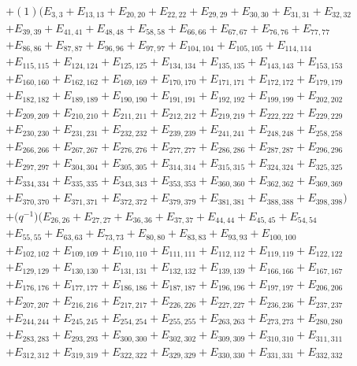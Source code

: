 \documentclass[pdftex]{sigma}
\numberwithin{equation}{section}
\theoremstyle{definition}
\begin{document}
\begin{align*}
&+(1)(E_{3,3}+E_{13,13}+E_{20,20}+E_{22,22}+E_{29,29}+E_{30,30}+E_{31,31}+E_{32,32}\\
&+E_{39,39}+E_{41,41}+E_{48,48}+E_{58,58}+E_{66,66}+E_{67,67}+E_{76,76}+E_{77,77}\\
&+E_{86,86}+E_{87,87}+E_{96,96}+E_{97,97}+E_{104,104}+E_{105,105}+E_{114,114}\\
&+E_{115,115}+E_{124,124}+E_{125,125}+E_{134,134}+E_{135,135}+E_{143,143}+E_{153,153}\\
&+E_{160,160}+E_{162,162}+E_{169,169}+E_{170,170}+E_{171,171}+E_{172,172}+E_{179,179}\\
&+E_{182,182}+E_{189,189}+E_{190,190}+E_{191,191}+E_{192,192}+E_{199,199}+E_{202,202}\\
&+E_{209,209}+E_{210,210}+E_{211,211}+E_{212,212}+E_{219,219}+E_{222,222}+E_{229,229}\\
&+E_{230,230}+E_{231,231}+E_{232,232}+E_{239,239}+E_{241,241}+E_{248,248}+E_{258,258}\\
&+E_{266,266}+E_{267,267}+E_{276,276}+E_{277,277}+E_{286,286}+E_{287,287}+E_{296,296}\\
&+E_{297,297}+E_{304,304}+E_{305,305}+E_{314,314}+E_{315,315}+E_{324,324}+E_{325,325}\\
&+E_{334,334}+E_{335,335}+E_{343,343}+E_{353,353}+E_{360,360}+E_{362,362}+E_{369,369}\\
&+E_{370,370}+E_{371,371}+E_{372,372}+E_{379,379}+E_{381,381}+E_{388,388}+E_{398,398})\\
&+\bigl(q^{-1}\bigr)(E_{26,26}+E_{27,27}+E_{36,36}+E_{37,37}+E_{44,44}+E_{45,45}+E_{54,54}\\
&+E_{55,55}+E_{63,63}+E_{73,73}+E_{80,80}+E_{83,83}+E_{93,93}+E_{100,100}\\
&+E_{102,102}+E_{109,109}+E_{110,110}+E_{111,111}+E_{112,112}+E_{119,119}+E_{122,122}\\
&+E_{129,129}+E_{130,130}+E_{131,131}+E_{132,132}+E_{139,139}+E_{166,166}+E_{167,167}\\
&+E_{176,176}+E_{177,177}+E_{186,186}+E_{187,187}+E_{196,196}+E_{197,197}+E_{206,206}\\
&+E_{207,207}+E_{216,216}+E_{217,217}+E_{226,226}+E_{227,227}+E_{236,236}+E_{237,237}\\
&+E_{244,244}+E_{245,245}+E_{254,254}+E_{255,255}+E_{263,263}+E_{273,273}+E_{280,280}\\
&+E_{283,283}+E_{293,293}+E_{300,300}+E_{302,302}+E_{309,309}+E_{310,310}+E_{311,311}\\
&+E_{312,312}+E_{319,319}+E_{322,322}+E_{329,329}+E_{330,330}+E_{331,331}+E_{332,332}\\

\end{align*}
\end{document}
